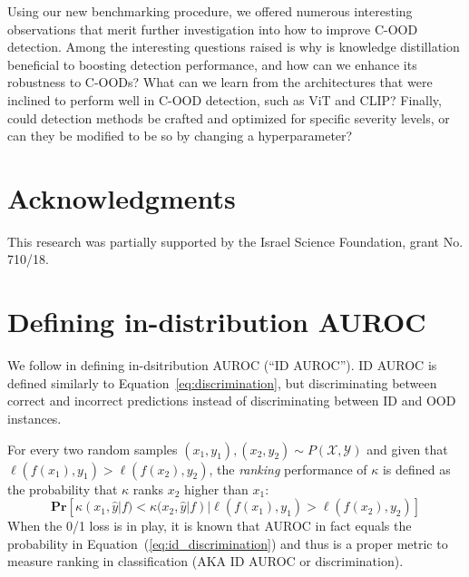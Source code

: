 \documentclass[table]{article} \usepackage{PRIMEarxiv}
\begin{document}
Using our new benchmarking procedure, we offered numerous interesting observations that merit further investigation into how to improve C-OOD detection. Among the interesting questions raised is why is knowledge distillation beneficial to boosting detection performance, and how can we enhance its robustness to C-OODs? 
What can we learn from the architectures that were inclined to perform well in C-OOD detection, such as ViT and CLIP?
Finally, could detection methods be crafted and optimized for specific severity levels, or can they be modified to be so by changing a hyperparameter?

\section*{Acknowledgments}
This research was partially supported by the Israel Science Foundation, grant No. 710/18.





\appendix

\section{Defining in-distribution AUROC}
\label{sec:id-auroc}

We follow \citet{galil2023what} in defining in-dsitribution AUROC (``ID AUROC''). ID AUROC is defined similarly to Equation~\ref{eq:discrimination}, but discriminating between correct and incorrect predictions instead of discriminating between ID and OOD instances.

For every two random samples $(x_1,y_1),(x_2,y_2)\sim P(\mathcal{X},\mathcal{Y})$ and given that $\ell (f(x_1),y_1) > \ell (f(x_2),y_2)$, the \emph{ranking} performance of $\kappa$ is defined as the probability that $\kappa$ ranks $x_2$ higher than $x_1$: 
\begin{equation}
\label{eq:id_discrimination}
        \mathbf{Pr}[\kappa(x_1,\hat{y}|f)<\kappa(x_2,\hat{y}|f)|\ell (f(x_1),y_1)>\ell (f(x_2),y_2)]
\end{equation}
When the 0/1 loss is in play, it is known that AUROC in fact equals the probability in Equation~(\ref{eq:id_discrimination}) \citep{FAWCETT2006861} and thus is a proper metric to measure ranking in classification (AKA ID AUROC or discrimination).
\end{document}
